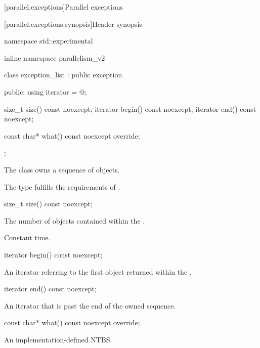 
[parallel.exceptions]{Parallel exceptions}

[parallel.exceptions.synopsis]{Header  synopsis}

\begin{codeblock}
namespace std::experimental {
inline namespace parallelism_v2 {

  class exception_list : public exception {
  public:
    using iterator = @\unspec@;

    size_t size() const noexcept;
    iterator begin() const noexcept;
    iterator end() const noexcept;

    const char* what() const noexcept override;
  };
}
}
\end{codeblock}

\pnum
The class  owns a sequence of  objects.

\pnum
The type  fulfills the requirements of .

\begin{itemdecl}
size_t size() const noexcept;
\end{itemdecl}

\begin{itemdescr}
  \pnum
  \returns The number of  objects contained within the .

  \pnum
  \complexity Constant time.
\end{itemdescr}

\begin{itemdecl}
iterator begin() const noexcept;
\end{itemdecl}

\begin{itemdescr}
  \pnum
  \returns An iterator referring to the first  object returned within the .
\end{itemdescr}

\begin{itemdecl}
iterator end() const noexcept;
\end{itemdecl}

\begin{itemdescr}
  \pnum
  \returns An iterator that is past the end of the owned sequence.
\end{itemdescr}

\begin{itemdecl}
const char* what() const noexcept override;
\end{itemdecl}

\begin{itemdescr}
  \pnum
  \returns An implementation-defined NTBS.
\end{itemdescr}

